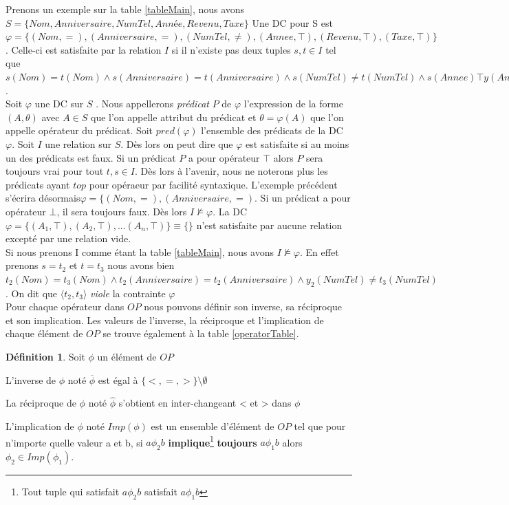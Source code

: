 \documentclass[letterpaper, 12pt]{report}
\theoremstyle{definition}
\newtheorem{mydef}{Définition}
\begin{document}
Prenons un exemple sur la table \ref{tableMain}, nous avons $S=\{Nom,Anniversaire,NumTel,Année,Revenu,Taxe \}$ Une DC pour S est $\varphi =\{(Nom,=),(Anniversaire,=),(NumTel,\neq),(Annee,\top),(Revenu,\top) ,(Taxe,\top) \}$. Celle-ci est satisfaite par la relation $I$ si il n'existe pas deux tuples $s,t\in I$ tel que $s(Nom) = t(Nom) \wedge s(Anniversaire) = t(Anniversaire) \wedge s(NumTel) \neq t(NumTel) \wedge s(Annee) \top y(Annee) \wedge s(Revenu) \top t(Revenu) \wedge s(Taxe) \top t(Taxe)$.\\

Soit $\varphi$ une DC sur $S$ . Nous appellerons \emph{prédicat} $P$ de $\varphi$ l'expression de la forme $(A,\theta)$ avec $A\in S$ que l'on appelle attribut du prédicat et $\theta = \varphi(A)$ que l'on appelle opérateur du prédicat. Soit $pred(\varphi)$ l'ensemble des prédicats de la DC $\varphi$. Soit $I$ une relation sur $S$. Dès lors on peut dire que $\varphi$ est satisfaite si au moins un des prédicats est faux. Si un prédicat $P$ a pour opérateur $\top$ alors $P$ sera toujours vrai pour tout $t,s \in I$. Dès lors à l'avenir, nous ne noterons plus les prédicats ayant $top$ pour opéraeur par facilité syntaxique. L'exemple précédent s'écrira désormais$\varphi =\{(Nom,=),(Anniversaire,=)$. Si un prédicat a pour opérateur $\bot$, il sera toujours faux. Dès lors $I \not\models \varphi$. La DC $\varphi = \{(A_1,\top),(A_2,\top),...(A_n,\top)\} \equiv \{ \}$ n'est satisfaite par aucune relation excepté par une relation vide.\\

 Si nous prenons I comme étant la table \ref{tableMain}, nous avons $I \not\models \varphi$. En effet prenons $s=t_2$ et $t=t_3$ nous avons bien $t_2(Nom) = t_3(Nom) \wedge t_2(Anniversaire) = t_2(Anniversaire) \wedge y_2(NumTel) \neq t_3(NumTel)$. On dit que $\langle t_2,t_3 \rangle$ \emph{viole} la contrainte $\varphi$\\ 

Pour chaque opérateur dans $OP$ nous pouvons définir son inverse, sa réciproque et son implication. Les valeurs de l'inverse, la réciproque et l'implication de chaque élément de $OP$ se trouve également à la table \ref{operatorTable}.
\begin{mydef}
Soit $\phi$ un élément de $OP$

L'inverse de $\phi$ noté $\overline{\phi}$ est égal à $\{<,=,>\}\setminus \emptyset$

La réciproque de $\phi$ noté $\hat{\phi}$ s'obtient en inter-changeant < et > dans $\phi$

L'implication de $\phi$ noté $Imp(\phi)$ est un ensemble d'élément de $OP$ tel que pour n'importe quelle valeur a et b, si $a \phi_2 b$ \textbf{implique}\footnote{Tout tuple qui satisfait $a \phi_2 b$ satisfait $a \phi_1 b$} \textbf{toujours} $a \phi_1  b$ alors $\phi_2       \in Imp(\phi_1)$.
\end{mydef}
\end{document}

